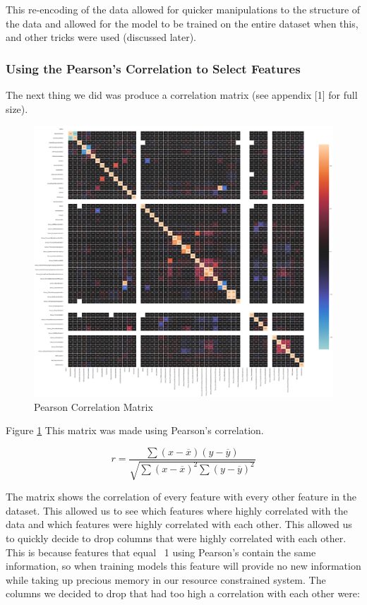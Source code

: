 \documentclass[sigconf]{acmart}
\begin{document}
This re-encoding of the data allowed for quicker manipulations to the structure of the data and allowed for the model to be trained on the entire dataset when this, and other tricks were used (discussed later). 
 \subsubsection{Using the Pearson's Correlation to Select Features}
 The next thing we did was produce a correlation matrix (see appendix [1] for full size). 
 \begin{figure}
  \includegraphics[width=\linewidth]{correlation.PNG}
  \caption{Pearson Correlation Matrix}
  \label{fig:matrix}
\end{figure}

Figure \ref{fig:matrix} This matrix was made using Pearson's correlation. 

\begin{equation}
r=\frac{\sum(x-\overline{x})(y-\overline{y})}{\sqrt{\sum(x-\overline{x})^{2} \sum(y-\overline{y})^{2}}}
\end{equation}

 The matrix shows the correlation of every feature with every other feature in the dataset. This allowed us to see which features where highly correlated with the data and which features were highly correlated with each other. 
 This allowed us to quickly decide to drop columns that were highly correlated with each other. This is because features that equal ~1 using Pearson's contain the same information, so when training models this feature will provide no new information while taking up precious memory in our resource constrained system. The columns we decided to drop that had too high a correlation with each other were:
\end{document}
